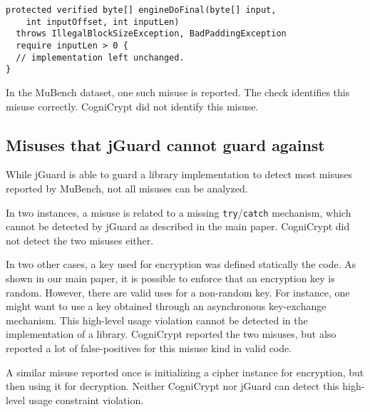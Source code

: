 \documentclass{article}
\begin{document}
\begin{lstlisting}[style=jGuard]
protected verified byte[] engineDoFinal(byte[] input,
    int inputOffset, int inputLen)
  throws IllegalBlockSizeException, BadPaddingException
  require inputLen > 0 {
  // implementation left unchanged.
}
\end{lstlisting}

In the MuBench dataset, one such misuse is reported.
The check identifies this misuse correctly.
CogniCrypt did not identify this misuse.

\subsection{Misuses that jGuard cannot guard against}

While jGuard is able to guard a library implementation to detect most misuses reported by MuBench,
not all misuses can be analyzed.

In two instances, a misuse is related to a missing \texttt{try}/\texttt{catch} mechanism,
which cannot be detected by jGuard as described in the main paper.
CogniCrypt did not detect the two misuses either.

In two other cases, a key used for encryption was defined statically the code.
As shown in our main paper, it is possible to enforce that an encryption key
is random.
However, there are valid uses for a non-random key. For instance, one might want to use a key obtained
through an asynchronous key-exchange mechanism.
This high-level usage violation cannot be detected in the implementation of a library.
CogniCrypt reported the two misuses, but also reported a lot of false-positives for
this misuse kind in valid code.

A similar misuse reported once is initializing a cipher instance for encryption, but then using it for
decryption.
Neither CogniCrypt nor jGuard can detect this high-level usage constraint violation.
\end{document}
